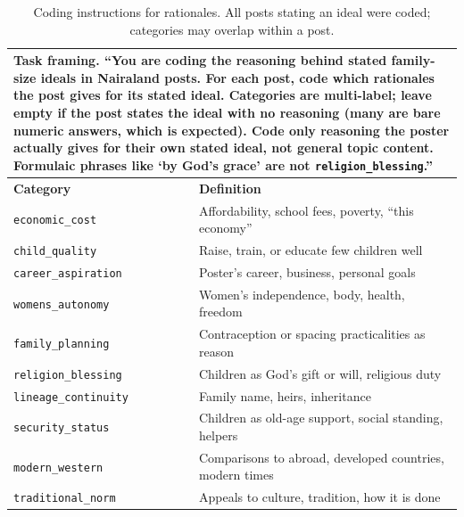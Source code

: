 \begin{table}[t]
\centering
\footnotesize
\begin{tabular}{p{3.4cm}p{10.4cm}}
\toprule
\multicolumn{2}{p{13.8cm}}{\textbf{Task framing.} ``You are coding the
reasoning behind stated family-size ideals in Nairaland posts. For each post,
code which rationales the post gives for its stated ideal. Categories are
multi-label; leave empty if the post states the ideal with no reasoning
(many are bare numeric answers, which is expected). Code only reasoning the
poster actually gives for their own stated ideal, not general topic content.
Formulaic phrases like `by God's grace' are not
\texttt{religion\_blessing}.''} \\
\midrule
\textbf{Category} & \textbf{Definition} \\
\midrule
\texttt{economic\_cost} & Affordability, school fees, poverty, ``this economy'' \\
\texttt{child\_quality} & Raise, train, or educate few children well \\
\texttt{career\_aspiration} & Poster's career, business, personal goals \\
\texttt{womens\_autonomy} & Women's independence, body, health, freedom \\
\texttt{family\_planning} & Contraception or spacing practicalities as reason \\
\texttt{religion\_blessing} & Children as God's gift or will, religious duty \\
\texttt{lineage\_continuity} & Family name, heirs, inheritance \\
\texttt{security\_status} & Children as old-age support, social standing, helpers \\
\texttt{modern\_western} & Comparisons to abroad, developed countries, modern times \\
\texttt{traditional\_norm} & Appeals to culture, tradition, how it is done \\
\bottomrule
\end{tabular}
\caption{Coding instructions for rationales. All posts stating an ideal were
coded; categories may overlap within a post.}
\label{tab:codebook_rationales}
\end{table}


